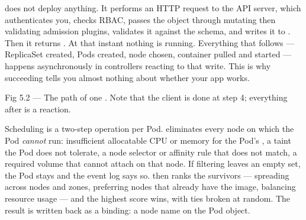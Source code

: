 \begin{behind}
 does not deploy anything. It performs an HTTP request to the API server, which authenticates you, checks RBAC, passes the object through mutating then validating admission plugins, validates it against the schema, and writes it to . Then it returns . At that instant nothing is running. Everything that follows --- ReplicaSet created, Pods created, node chosen, container pulled and started --- happens asynchronously in controllers reacting to that write. This is why  succeeding tells you almost nothing about whether your app works.
\end{behind}

\begin{wbfigure}{Fig 5.2 — The path of one . Note that the client is done at step 4; everything after is a reaction.}
\end{wbfigure}

 Scheduling is a two-step operation per Pod.  eliminates every node on which the Pod \emph{cannot} run: insufficient allocatable CPU or memory for the Pod's , a taint the Pod does not tolerate, a node selector or affinity rule that does not match, a required volume that cannot attach on that node. If filtering leaves an empty set, the Pod stays  and the event log says so.  then ranks the survivors --- spreading across nodes and zones, preferring nodes that already have the image, balancing resource usage --- and the highest score wins, with ties broken at random. The result is written back as a binding: a node name on the Pod object.

